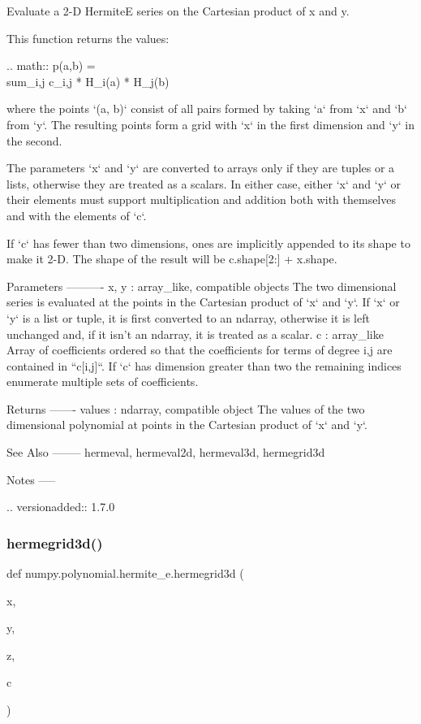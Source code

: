 \begin{DoxyVerb}Evaluate a 2-D HermiteE series on the Cartesian product of x and y.

This function returns the values:

.. math:: p(a,b) = \\sum_{i,j} c_{i,j} * H_i(a) * H_j(b)

where the points `(a, b)` consist of all pairs formed by taking
`a` from `x` and `b` from `y`. The resulting points form a grid with
`x` in the first dimension and `y` in the second.

The parameters `x` and `y` are converted to arrays only if they are
tuples or a lists, otherwise they are treated as a scalars. In either
case, either `x` and `y` or their elements must support multiplication
and addition both with themselves and with the elements of `c`.

If `c` has fewer than two dimensions, ones are implicitly appended to
its shape to make it 2-D. The shape of the result will be c.shape[2:] +
x.shape.

Parameters
----------
x, y : array_like, compatible objects
    The two dimensional series is evaluated at the points in the
    Cartesian product of `x` and `y`.  If `x` or `y` is a list or
    tuple, it is first converted to an ndarray, otherwise it is left
    unchanged and, if it isn't an ndarray, it is treated as a scalar.
c : array_like
    Array of coefficients ordered so that the coefficients for terms of
    degree i,j are contained in ``c[i,j]``. If `c` has dimension
    greater than two the remaining indices enumerate multiple sets of
    coefficients.

Returns
-------
values : ndarray, compatible object
    The values of the two dimensional polynomial at points in the Cartesian
    product of `x` and `y`.

See Also
--------
hermeval, hermeval2d, hermeval3d, hermegrid3d

Notes
-----

.. versionadded:: 1.7.0\end{DoxyVerb}
 \mbox{\label{namespacenumpy_1_1polynomial_1_1hermite__e_abe4a0db8e1ee92773aa35ad8b9599546}} 
\subsubsection{\texorpdfstring{hermegrid3d()}{hermegrid3d()}}
{\footnotesize\ttfamily def numpy.\+polynomial.\+hermite\+\_\+e.\+hermegrid3d (\begin{DoxyParamCaption}\item[{}]{x,  }\item[{}]{y,  }\item[{}]{z,  }\item[{}]{c }\end{DoxyParamCaption})}

